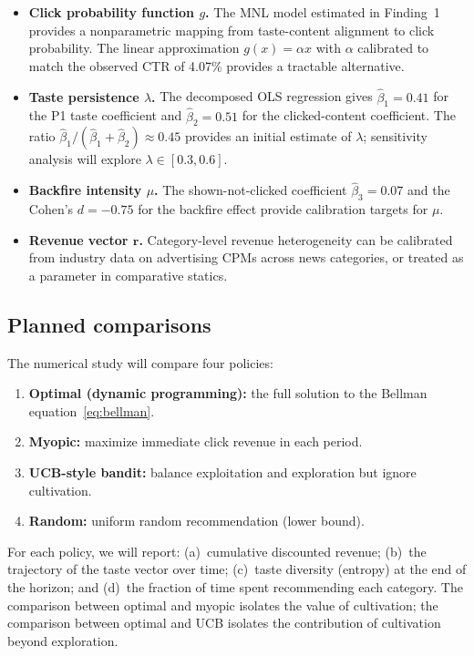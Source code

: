 \documentclass[11pt]{article}
\begin{document}
\begin{itemize}[leftmargin=1.5em, itemsep=0.3em]
\item \textbf{Click probability function $g$.} The MNL model estimated in Finding~1 provides a nonparametric mapping from taste-content alignment to click probability. The linear approximation $g(x) = \alpha x$ with $\alpha$ calibrated to match the observed CTR of 4.07\% provides a tractable alternative.

\item \textbf{Taste persistence $\lambda$.} The decomposed OLS regression gives $\hat{\beta}_1 = 0.41$ for the P1 taste coefficient and $\hat{\beta}_2 = 0.51$ for the clicked-content coefficient. The ratio $\hat{\beta}_1/(\hat{\beta}_1 + \hat{\beta}_2) \approx 0.45$ provides an initial estimate of $\lambda$; sensitivity analysis will explore $\lambda \in [0.3, 0.6]$.

\item \textbf{Backfire intensity $\mu$.} The shown-not-clicked coefficient $\hat{\beta}_3 = 0.07$ and the Cohen's $d = -0.75$ for the backfire effect provide calibration targets for $\mu$.

\item \textbf{Revenue vector $\mathbf{r}$.} Category-level revenue heterogeneity can be calibrated from industry data on advertising CPMs across news categories, or treated as a parameter in comparative statics.
\end{itemize}

\subsection{Planned comparisons}

The numerical study will compare four policies:

\begin{enumerate}[leftmargin=1.5em]
\item \textbf{Optimal (dynamic programming):} the full solution to the Bellman equation~\eqref{eq:bellman}.
\item \textbf{Myopic:} maximize immediate click revenue in each period.
\item \textbf{UCB-style bandit:} balance exploitation and exploration but ignore cultivation.
\item \textbf{Random:} uniform random recommendation (lower bound).
\end{enumerate}

For each policy, we will report: (a)~cumulative discounted revenue; (b)~the trajectory of the taste vector over time; (c)~taste diversity (entropy) at the end of the horizon; and (d)~the fraction of time spent recommending each category. The comparison between optimal and myopic isolates the value of cultivation; the comparison between optimal and UCB isolates the contribution of cultivation beyond exploration.
\end{document}
